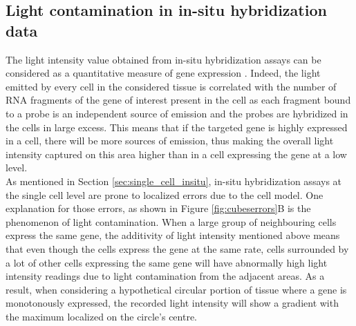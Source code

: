   \subsection{Light contamination in in-situ hybridization data}
  The light intensity value obtained from in-situ hybridization assays can be considered as a quantitative measure of gene expression \cite{dorresteijn90}. Indeed, the light emitted by every cell in the considered tissue is correlated with the number of RNA fragments of the gene of interest present in the cell as each fragment bound to a probe is an independent source of emission and the probes are hybridized in the cells in large excess. This means that if the targeted gene is highly expressed in a cell, there will be more sources of emission, thus making the overall light intensity captured on this area higher than in a cell expressing the gene at a low level. \\
  
  As mentioned in Section \ref{sec:single_cell_insitu}, in-situ hybridization assays at the single cell level are prone to localized errors due to the cell model. One explanation for those errors, as shown in Figure \ref{fig:cubeserrors}B is the phenomenon of light contamination. When a large group of neighbouring cells express the same gene, the additivity of light intensity mentioned above means that even though the cells express the gene at the same rate, cells surrounded by a lot of other cells expressing the same gene will have abnormally high light intensity readings due to light contamination from the adjacent areas. As a result, when considering a hypothetical circular portion of tissue where a gene is monotonously expressed, the recorded light intensity will show a gradient with the maximum localized on the circle's centre.\\
  
